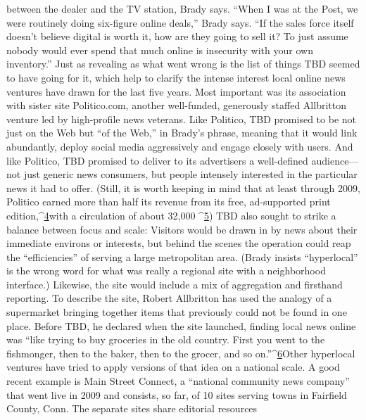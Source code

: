 between the dealer and the TV station, Brady says.
``When I was at the Post, we were routinely doing six-figure online deals,''
Brady says. ``If the sales force itself doesn't believe digital is worth it, how are they
going to sell it? To just assume nobody would ever spend that much online is
insecurity with your own inventory.''
Just as revealing as what went wrong is the list of things TBD seemed to have
going for it, which help to clarify the intense interest local online news ventures
have drawn for the last five years. Most important was its association with sister
site Politico.com, another well-funded, generously staffed Allbritton venture led
by high-profile news veterans. Like Politico, TBD promised to be not just on the
Web but ``of the Web,'' in Brady's phrase, meaning that it would link abundantly,
deploy social media aggressively and engage closely with users. And like Politico,
TBD promised to deliver to its advertisers a well-defined audience—not just
generic news consumers, but people intensely interested in the particular news it
had to offer. (Still, it is worth keeping in mind that at least through 2009, Politico
earned more than half its revenue from its free, ad-supported print edition,^{\href{#endnotes-chapter-3}{4}}with
a circulation of about 32,000 ^{\href{#endnotes-chapter-3}{5}})
TBD also sought to strike a balance between focus and scale: Visitors would
be drawn in by news about their immediate environs or interests, but behind the
scenes the operation could reap the ``efficiencies'' of serving a large metropolitan
area. (Brady insists ``hyperlocal'' is the wrong word for what was really a regional
site with a neighborhood interface.) Likewise, the site would include a mix of
aggregation and firsthand reporting. To describe the site, Robert Allbritton has
used the analogy of a supermarket bringing together items that previously could
not be found in one place. Before TBD, he declared when the site launched, finding
local news online was ``like trying to buy groceries in the old country. First
you went to the fishmonger, then to the baker, then to the grocer, and so on.''^{\href{#endnotes-chapter-3}{6}}Other hyperlocal ventures have tried to apply versions of that idea on a national
scale. A good recent example is Main Street Connect, a ``national community
news company'' that went live in 2009 and consists, so far, of 10 sites serving
towns in Fairfield County, Conn. The separate sites share editorial resources

